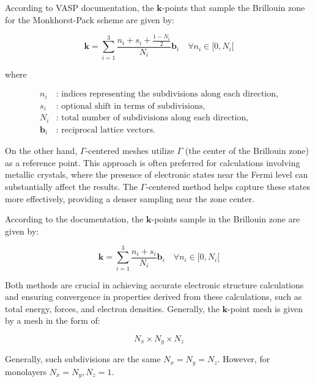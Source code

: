 \begin{itemize}
According to VASP documentation, the \(\mathbf{k}\)-points that sample the Brillouin zone for the Monkhorst-Pack scheme are given by:

\begin{equation}
	\mathbf{k} = \sum_{i=1}^{3} \frac{n_i + s_i + \frac{1 - N_i}{2}}{N_i} \mathbf{b}_i \quad \forall n_i \in [0, N_i[
\end{equation}

where

\begin{equation}
	\begin{aligned}
		n_i &: \text{ indices representing the subdivisions along each direction,} \\
		s_i &: \text{ optional shift in terms of subdivisions,} \\
		N_i &: \text{ total number of subdivisions along each direction,} \\
		\mathbf{b}_i &: \text{ reciprocal lattice vectors.}
	\end{aligned}
\end{equation}

On the other hand, \(\Gamma\)-centered meshes utilize \(\Gamma\) (the center of the Brillouin zone) as a reference point. This approach is often preferred for calculations involving metallic crystals, where the presence of electronic states near the Fermi level can substantially affect the results. The \(\Gamma\)-centered method helps capture these states more effectively, providing a denser sampling near the zone center.

According to the documentation, the \(\mathbf{k}\)-points sample in the Brillouin zone are given by:

\begin{equation}
	\mathbf{k} = \sum_{i=1}^{3} \frac{n_i + s_i}{N_i} \mathbf{b}_i \quad \forall n_i \in [0, N_i[
\end{equation}

Both methods are crucial in achieving accurate electronic structure calculations and ensuring convergence in properties derived from these calculations, such as total energy, forces, and electron densities. Generally, the \(\mathbf{k}\)-point mesh is given by a mesh in the form of:

\begin{equation}
	N_x \times N_y \times N_z
\end{equation}

Generally, such subdivisions are the same \(N_x = N_y = N_z\). However, for monolayers \(N_x = N_y, N_z = 1\).


\end{itemize}

